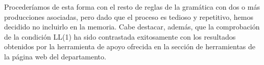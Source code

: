 Procederíamos de esta forma con el resto de reglas de la gramática con dos o más producciones asociadas, pero dado que el proceso es tedioso y repetitivo, hemos decidido no incluirlo en la memoria. Cabe destacar, además, que la comprobación de la condición LL(1) ha sido contrastada exitosamente con los resultados obtenidos por la herramienta de apoyo ofrecida en la sección de herramientas de la página web del departamento.\\